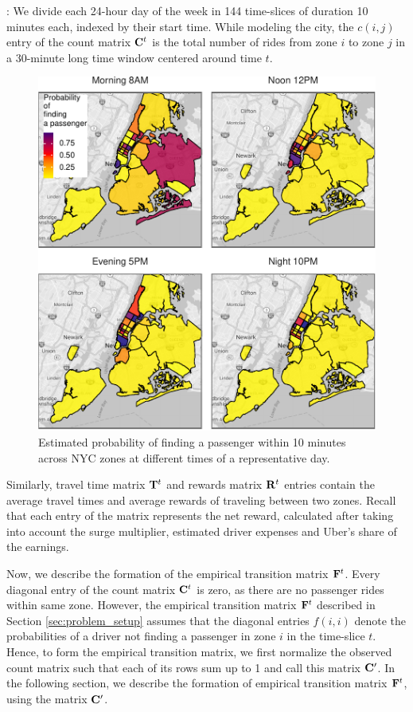 :
We divide each 24-hour day of the week in 144 time-slices of duration 10 minutes each, indexed by their start time. While modeling the city, the $c(i,j)$ entry of the count matrix ${\mathbf{C}}^t$ is the total number of rides from zone $i$ to zone $j$ in a 30-minute long time window centered around time $t$. 

\begin{figure}
	\centering
	\includegraphics{figures/successful_heatmap.pdf}
	\caption{Estimated probability of finding a passenger within 10 minutes across NYC zones at different times of a representative day.}
	\label{fig:successful_heatmap}
\end{figure}

Similarly, travel time matrix ${\mathbf{T}}^t$ and rewards matrix ${\mathbf{R}}^t$ entries contain the average travel times and average rewards of traveling between two zones. Recall that each entry of the {\rewardsmatrix} matrix represents the net reward, calculated after taking into account the surge multiplier, estimated driver expenses and Uber's share of the earnings.



Now, we describe the formation of the empirical transition matrix ${\mathbf{F}}^t$. Every diagonal entry of the count matrix ${\mathbf{C}}^t$ is zero, as there are no passenger rides within same zone. However, the empirical transition matrix ${\mathbf{F}}^t$ described in Section \ref{sec:problem_setup} assumes that the diagonal entries $f(i,i)$ denote the probabilities of a driver not finding a passenger in zone $i$ in the time-slice $t$. Hence, to form the empirical transition matrix, we first normalize the observed count matrix such that each of its rows sum up to 1 and call this matrix ${\mathbf{C}}^\prime$. 
In the following section, we describe the formation of empirical transition matrix ${\mathbf{F}}^t$, using the matrix ${\mathbf{C}}^\prime$.

